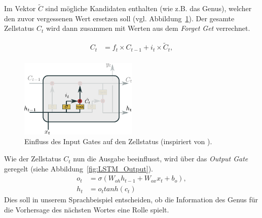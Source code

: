             Im Vektor $\tilde{C}$ sind mögliche Kandidaten enthalten (wie z.B. das Genus), welcher den zuvor vergessenen Wert ersetzen soll (vgl. Abbildung~\ref{fig:LSTM_Input}).
            Der gesamte Zellstatus $C_t$ wird dann zusammen mit Werten aus dem \textit{Forget Get} verrechnet.

            \begin{equation}
                \begin{split}
                    C_t &=f_t\times C_{t-1} + i_t\times \tilde{C}_t, \\
                \end{split}
            \end{equation}

                \begin{figure}[ht]
                    \centering
                    \includegraphics[width=0.5\textwidth]{images/Illustrationen/LSTM_IG}
                    \caption{Einfluss des Input Gates auf den Zellstatus (inspiriert von \cite{OLAH2015}).}
                    \label{fig:LSTM_Input}
                \end{figure}
            
            Wie der Zellstatus $C_t$ nun die Ausgabe beeinflusst, wird über das \textit{Output Gate} geregelt (siehe Abbildung~\ref{fig:LSTM_Output}).
            \begin{equation}
                \begin{split}
                    o_t &= \sigma\left(W_{oh}h_{t-1} + W_{ox}x_t + b_o \right), \\
                    h_t &= o_ttanh\left(c_t\right)
                \end{split}
            \end{equation}
            Dies soll in unserem Sprachbeispiel entscheiden, ob die Information des Genus für die Vorhersage des nächsten Wortes eine Rolle spielt. \cite{GERS2000} \cite{OLAH2015}

